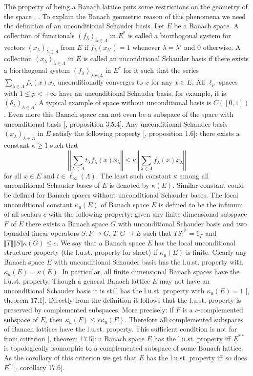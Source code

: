 The property of being a Banach lattice puts some restrictions on the geometry of the space \cite{SherOrderInOpAlg}, \cite{KadOrderPropOfBoundSAOps}. To explain the Banach geometric reason of this phenomena we need the definition of an unconditional Schauder basis. Let $E$ be a Banach space. A collection of functionals $(f_\lambda)_{\lambda\in\Lambda}$ in $E^*$ is called a biorthogonal system for vectors $(x_\lambda)_{\lambda\in\Lambda}$  from $E$ if $f_\lambda(x_{\lambda'})=1$ whenever $\lambda=\lambda'$ and $0$ otherwise. A collection $(x_\lambda)_{\lambda\in\Lambda}$ in $E$ is called an unconditional Schauder basis if there exists a biorthogonal system $(f_\lambda)_{\lambda\in\Lambda}$ in $E^*$ for it such that
the series $\sum_{\lambda\in\Lambda} f_\lambda(x)x_\lambda$ unconditionally converges to $x$ for any $x\in E$. All $\ell_p$-spaces with $1\leq p<+\infty$ have an unconditional Schauder basis, for example, it is $(\delta_\lambda)_{\lambda\in\Lambda}$. A typical example of space without unconditional basis is $C([0,1])$. Even more this Banach space can not even be a subspace of the space with unconditional basis [\cite{KalAlbTopicsBanSpTh}, proposition 3.5.4].  Any unconditional Schauder basis $(x_\lambda)_{\lambda\in\Lambda}$ in $E$ satisfy the following property  [\cite{DiestAbsSumOps}, proposition 1.6]: there exists a constant $\kappa\geq 1$ such that
$$
\left\Vert \sum_{\lambda\in\Lambda}t_\lambda f_\lambda(x)x_\lambda\right\Vert
\leq
\kappa\left\Vert \sum_{\lambda\in\Lambda}f_\lambda(x)x_\lambda\right\Vert
$$
for all $x\in E$ and $t\in\ell_\infty(\Lambda)$. The least such constant $\kappa$ among all unconditional Schauder bases of $E$ is denoted by $\kappa(E)$. Similar constant could be defined for Banach spaces without unconditional Schauder bases. The local unconditional constant $\kappa_u(E)$ of Banach space $E$ is defined to be the infimum of all scalars $c$ with the following property: given any finite dimensional subspace $F$ of $E$ there exists a Banach space $G$ with unconditional Schauder basis and two bounded linear operators $S:F\to G$, $T:G\to E$ such that $TS|^{F}=1_F$ and $\Vert T\Vert\Vert S\Vert\kappa(G)\leq c$. We say that a Banach space $E$ has the local unconditional structure property (the l.u.st. property for short) if $\kappa_u(E)$ is finite. Clearly any Banach space $E$ with unconditional Schauder basis has the l.u.st. property with $\kappa_u(E)=\kappa(E)$. In particular, all finite dimensional Banach spaces have the l.u.st. property. Though a general Banach lattice $E$ may not have an unconditional Schauder basis it is still has the l.u.st. property with $\kappa_u(E)=1$  [\cite{DiestAbsSumOps}, theorem 17.1]. Directly from the definition it follows that the l.u.st. property is preserved by complemented subspaces. More precisely: if $F$ is a $c$-complemented subspace of $E$, then $\kappa_u(F)\leq c\kappa_u(E)$. Therefore all complemented subspaces of Banach lattices have the l.u.st. property. This sufficient condition is not far from criterion [\cite{DiestAbsSumOps}, theorem 17.5]: a Banach space $E$ has the l.u.st. property iff $E^{**}$ is topologically isomorphic to a complemented subspace of some Banach lattice. As the corollary of this criterion we get that $E$ has the l.u.st. property iff so does $E^*$ [\cite{DiestAbsSumOps}, corollary 17.6].

